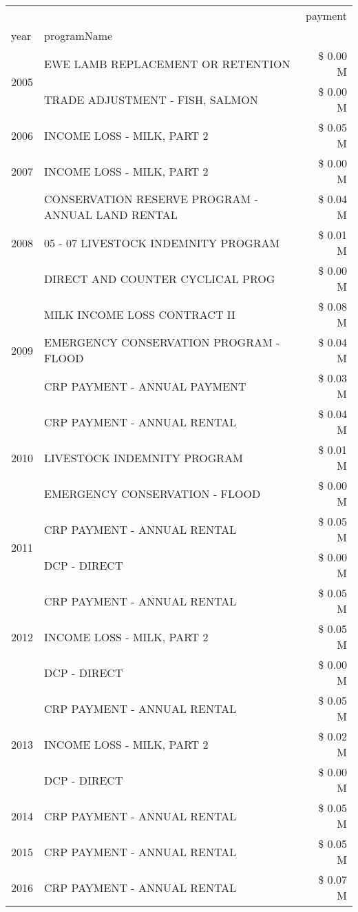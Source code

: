 \begin{tabular}{llr}
\toprule
 &  & payment \\
year & programName &  \\
\midrule
\multirow[t]{2}{*}{2005} & EWE LAMB REPLACEMENT OR RETENTION & \$ 0.00 M \\
 & TRADE ADJUSTMENT - FISH, SALMON & \$ 0.00 M \\
\cline{1-3}
2006 & INCOME LOSS - MILK, PART 2 & \$ 0.05 M \\
\cline{1-3}
2007 & INCOME LOSS - MILK, PART 2 & \$ 0.00 M \\
\cline{1-3}
\multirow[t]{3}{*}{2008} & CONSERVATION RESERVE PROGRAM - ANNUAL LAND RENTAL & \$ 0.04 M \\
 & 05 - 07 LIVESTOCK INDEMNITY PROGRAM & \$ 0.01 M \\
 & DIRECT AND COUNTER CYCLICAL PROG & \$ 0.00 M \\
\cline{1-3}
\multirow[t]{3}{*}{2009} & MILK INCOME LOSS CONTRACT II & \$ 0.08 M \\
 & EMERGENCY CONSERVATION PROGRAM - FLOOD & \$ 0.04 M \\
 & CRP PAYMENT - ANNUAL PAYMENT & \$ 0.03 M \\
\cline{1-3}
\multirow[t]{3}{*}{2010} & CRP PAYMENT - ANNUAL RENTAL & \$ 0.04 M \\
 & LIVESTOCK INDEMNITY PROGRAM & \$ 0.01 M \\
 & EMERGENCY CONSERVATION - FLOOD & \$ 0.00 M \\
\cline{1-3}
\multirow[t]{2}{*}{2011} & CRP PAYMENT - ANNUAL RENTAL & \$ 0.05 M \\
 & DCP - DIRECT & \$ 0.00 M \\
\cline{1-3}
\multirow[t]{3}{*}{2012} & CRP PAYMENT - ANNUAL RENTAL & \$ 0.05 M \\
 & INCOME LOSS - MILK, PART 2 & \$ 0.05 M \\
 & DCP - DIRECT & \$ 0.00 M \\
\cline{1-3}
\multirow[t]{3}{*}{2013} & CRP PAYMENT - ANNUAL RENTAL & \$ 0.05 M \\
 & INCOME LOSS - MILK, PART 2 & \$ 0.02 M \\
 & DCP - DIRECT & \$ 0.00 M \\
\cline{1-3}
2014 & CRP PAYMENT - ANNUAL RENTAL & \$ 0.05 M \\
\cline{1-3}
2015 & CRP PAYMENT - ANNUAL RENTAL & \$ 0.05 M \\
\cline{1-3}
\multirow[t]{2}{*}{2016} & CRP PAYMENT - ANNUAL RENTAL & \$ 0.07 M \\

\end{tabular}
